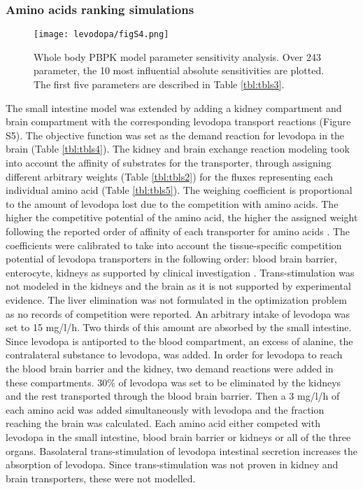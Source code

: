 \subsubsection{Amino acids ranking simulations} \label{levo:sp5}
\begin{figure}[!htp]
\centering
	\texttt{[image: levodopa/figS4.png]}%
	\caption[Whole body PBPK model parameter sensitivity analysis.]{Whole body PBPK model parameter sensitivity analysis. Over 243 parameter, the 10 most influential absolute sensitivities are plotted. The first five parameters are described in Table \ref{tbl:tbls3}.}
	\label{fig:s4levo}
\end{figure}
The small intestine model was extended by adding a kidney compartment and brain compartment with the corresponding levodopa transport reactions (Figure S5). The objective function was set as the demand reaction for levodopa in the brain (Table \ref{tbl:tbls4}). The kidney and brain exchange reaction modeling took into account the affinity of substrates for the transporter, through assigning different arbitrary weights (Table \ref{tbl:tbls2}) for the fluxes representing each individual amino acid (Table \ref{tbl:tbls5}). The weighing coefficient is proportional to the amount of levodopa lost due to the competition with amino acids. The higher the competitive potential of the amino acid, the higher the assigned weight following the reported order of affinity of each transporter for amino acids \cite{verrey2000glycoprotein}. The coefficients were calibrated to take into account the tissue-specific competition potential of levodopa transporters in the following order: blood brain barrier, enterocyte, kidneys as supported by clinical investigation \cite{robertson1991influence,nutt1984off}. Trans-stimulation was not modeled in the kidneys and the brain as it is not supported by experimental evidence. The liver elimination was not formulated in the optimization problem as no records of competition were reported. 
An arbitrary intake of levodopa was set to 15 mg/l/h. Two thirds of this amount are absorbed by the small intestine. Since levodopa is antiported to the blood compartment, an excess of alanine, the contralateral substance to levodopa, was added. In order for levodopa to reach the blood brain barrier and the kidney, two demand reactions were added in these compartments. 30\% of levodopa was set to be eliminated by the kidneys and the rest transported through the blood brain barrier. Then a 3 mg/l/h of each amino acid was added simultaneously with levodopa and the fraction reaching the brain was calculated. Each amino acid either competed with levodopa in the small intestine, blood brain barrier or kidneys or all of the three organs. Basolateral trans-stimulation of levodopa intestinal secretion increases the absorption of levodopa. Since trans-stimulation was not proven in kidney and brain transporters, these were not modelled.  
